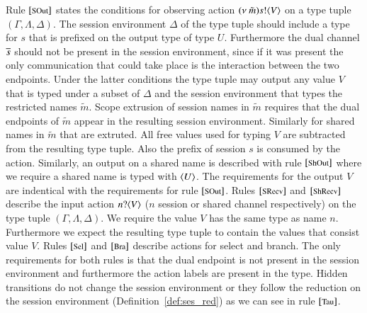 Rule ${\footnotesize [\textrm{SOut}]}$ states the conditions for observing action
$(\nu\ \tilde{m}) s ! \langle V \rangle$ on a type tuple $(\Gamma, \Lambda, \Delta)$. 
The session environment $\Delta$ of the type tuple should include
a type for $s$ that is prefixed on the output type of type $U$.
Furthermore the dual channel $\overline{s}$ should not be
present in the session environment, since if it was present
the only communication that could take place is the interaction
between the two endpoints.
Under the latter conditions the type tuple may output any
value $V$ that is typed under a subset of $\Delta$ and
the session environment that types the restricted names
$\tilde{m}$. Scope extrusion of session names in $\tilde{m}$ requires
that the dual endpoints of $\tilde{m}$ appear in
the resulting session environment. Similarly for shared names
in $\tilde{m}$ that are extruted.
All free values used for typing $V$ are subtracted from the
resulting type tuple. Also the prefix of session $s$ is consumed
by the action.
Similarly, an output on a shared name is described
with rule ${\footnotesize [\textrm{ShOut}]}$ where we require a shared name
is typed with $\langle U \rangle$. The requirements for
the output $V$ are indentical with the requirements for
rule ${\footnotesize [\textrm{SOut}]}$.
Rules ${\footnotesize [\textrm{SRecv}]}$ and ${\footnotesize [\textrm{ShRecv}]}$ describe
the input action $n ? \langle V \rangle$ ($n$ session or shared channel respectively)
on the type tuple $(\Gamma, \Lambda, \Delta)$.
We require the value $V$ has the same type as name $n$. Furthermore
we expect the resulting type tuple to contain the values that
consist value $V$.
Rules ${\footnotesize [\textrm{Sel}]}$ and ${\footnotesize [\textrm{Bra}]}$ describe actions for
select and branch. The only requirements for both
rules is that the dual endpoint is not present in the session
environment and furthermore the action labels are present
in the type.
Hidden transitions do not change the session environment
or they follow the reduction on the session
environment (Definition~\ref{def:ses_red}) as we can see in rule
${\footnotesize [\textrm{Tau}]}$.

\begin{comment}
A second environment LTS, denoted $\hby{\ell}$,
is defined in the lower part of Figure~\ref{fig:envLTS}.
The definition substitutes rules
$\eltsrule{SRecv}$ and $\eltsrule{ShRecv}$
of relation $\by{\ell}$ with rule $\eltsrule{RRcv}$.
All other cases remain the same as the cases for
relation $\by{\ell}$.
Rule $\eltsrule{RRcv}$ restricts the higher-order input
in relation $\hby{\ell}$;
only characteristic processes and trigger processes
are allowed to be received on a higher-order input.
Names can still be received as in the definition of
the $\by{\ell}$ relation.
The conditions for input follow the conditions
for the $\by{\ell}$ definition.
\end{comment}

